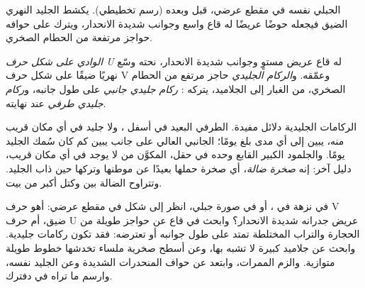 \begin{omfigure}
{\small {} الجبلي نفسه في مقطع عرضي، قبل  وبعده (رسم
تخطيطي). يكشط الجليد  النهري الضيق فيجعله حوضًا عريضًا له قاع واسع
وجوانب شديدة الانحدار، ويترك على حوافه حواجز مرتفعة من الحطام
الصخري.}
\label{fig:g8:ice-on-earth:v-and-u}
\end{omfigure}

\begin{definition}\label{def:g8:ice-on-earth:glacial-landforms}
\emph{الوادي على شكل حرف U}  له قاع عريض مستوٍ وجوانب
شديدة الانحدار، نحته  وسّع  نهريًا ضيقًا على شكل حرف V
وعمّقه. و\emph{الركام الجليدي} حاجز مرتفع من الحطام الصخري، من الغبار إلى
الجلاميد، يتركه : \emph{ركام جليدي جانبي} على طول جانبه،
و\emph{ركام جليدي طرفي} عند نهايته.
\end{definition}

الركامات الجليدية دلائل مفيدة.  الطرفي البعيد في أسفل ،
ولا جليد في أي مكان قريب منه، يبين إلى أي مدى بلغ  يومًا؛
 الجانبي العالي على جانب  يبين كم كان سُمك الجليد يومًا.
والجلمود الكبير القابع وحده في حقل، المكوَّن من  لا يوجد في أي مكان قريب،
دليل آخر: إنه \emph{صخرة ضالة}، أي صخرة حملها  بعيدًا عن موطنها
وتركها حين ذاب الجليد. وتتراوح  الضالة بين  وكتل أكبر من
بيت.

\begin{inthefield}
في نزهة في ، أو في صورة  جبلي، انظر إلى شكل  في مقطع عرضي:
أهو حرف V ضيق، أم حرف U عريض جدرانه شديدة الانحدار؟ وابحث في قاع  عن
حواجز طويلة من الحجارة والتراب المختلطة تمتد على طول جوانبه أو تعترضه: فقد
تكون ركامات جليدية. وابحث عن جلاميد كبيرة لا تشبه   بها، وعن أسطح
صخرية ملساء تخدشها خطوط طويلة متوازية. والزم الممرات، وابتعد عن حواف
المنحدرات الشديدة وعن الجليد نفسه، وارسم ما تراه في
دفترك.
\end{inthefield}

